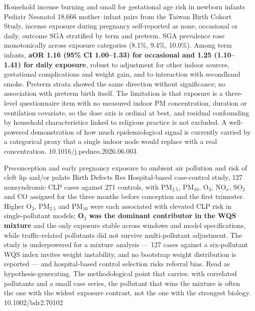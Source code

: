 \documentclass[10pt]{article}
\begin{document}
{Household incense burning and small for gestational age risk in newborn infants}
{Pediatr Neonatol}
{18,666 mother--infant pairs from the Taiwan Birth Cohort Study, incense exposure during
pregnancy self-reported as none, occasional or daily, outcome SGA stratified by term and
preterm. SGA prevalence rose monotonically across exposure categories (8.1\%, 9.4\%,
10.0\%). Among term infants, \textbf{aOR 1.16 (95\% CI 1.00--1.33) for occasional and
1.25 (1.10--1.41) for daily exposure}, robust to adjustment for other indoor sources,
gestational complications and weight gain, and to interaction with secondhand smoke.
Preterm strata showed the same direction without significance; no association with
preterm birth itself. The limitation is that exposure is a three-level questionnaire item
with no measured indoor PM concentration, duration or ventilation covariate, so the dose
axis is ordinal at best, and residual confounding by household characteristics linked to
religious practice is not excluded. A well-powered demonstration of how much
epidemiological signal is currently carried by a categorical proxy that a single indoor
node would replace with a real concentration.}
{10.1016/j.pedneo.2026.06.003}

{Preconception and early pregnancy exposure to ambient air pollution and risk of cleft
lip and/or palate}
{Birth Defects Res}
{Hospital-based case-control study, 127 nonsyndromic CLP cases against 271 controls, with
PM$_{2.5}$, PM$_{10}$, O$_3$, NO$_x$, SO$_2$ and CO assigned for the three months before
conception and the first trimester. Higher O$_3$, PM$_{2.5}$ and PM$_{10}$ were each
associated with elevated CLP risk in single-pollutant models; \textbf{O$_3$ was the
dominant contributor in the WQS mixture} and the only exposure stable across windows and
model specifications, while traffic-related pollutants did not survive multi-pollutant
adjustment. The study is underpowered for a mixture analysis --- 127 cases against a
six-pollutant WQS index invites weight instability, and no bootstrap weight distribution
is reported --- and hospital-based control selection risks referral bias. Read as
hypothesis-generating. The methodological point that carries: with correlated pollutants
and a small case series, the pollutant that wins the mixture is often the one with the
widest exposure contrast, not the one with the strongest biology.}
{10.1002/bdr2.70102}

\end{document}
